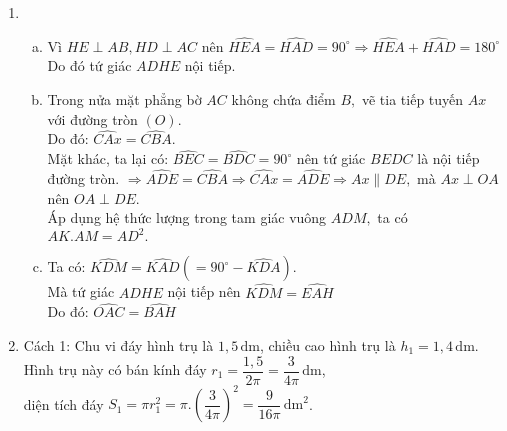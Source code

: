 \begin{ex}
{\begin{center}
	\end{center}
	\begin{enumerate}[1.]
		\item 
			\begin{enumerate}[a)]
				\item Vì $ HE \perp AB , HD \perp AC $ nên $ \widehat{HEA} =\widehat{HAD}=90^{\circ} \Rightarrow \widehat{HEA} +\widehat{HAD}=180^{\circ} $\\
				Do đó tứ giác $ ADHE $ nội tiếp.
				\item Trong nửa mặt phẳng bờ $ AC $ không chứa điểm $ B, $ vẽ tia tiếp tuyến $ Ax $ với đường tròn $ (O). $\\
				Do đó: $ \widehat{CAx}=\widehat{CBA}. $\\
				Mặt khác, ta lại có: $\widehat{BEC}=\widehat{BDC}=90^{\circ}  $ nên tứ giác $ BEDC $ là nội tiếp đường tròn. $ \Rightarrow \widehat{ADE}=\widehat{CBA} \Rightarrow \widehat{CAx}=\widehat{ADE} \Rightarrow Ax \parallel DE, $ mà $ Ax \perp OA $ nên $ OA \perp DE. $ \\
				Áp dụng hệ thức lượng trong tam giác vuông $ ADM, $ ta có $ AK.AM = AD^2. $
				\item Ta có: $ \widehat{KDM}=\widehat{KAD}(=90^{\circ}-\widehat{KDA}). $\\
				Mà tứ giác $ ADHE $ nội tiếp nên $ \widehat{KDM}=\widehat{EAH} $\\
				Do đó: $ \widehat{OAC}=\widehat{BAH} $ 
			\end{enumerate}
		\item Cách 1: Chu vi đáy hình trụ là $1,5\mathrm{\, dm}$, chiều cao hình trụ là $ h_1=1,4\mathrm{\, dm}$.\\
		Hình trụ này có bán kính đáy $ r_1 = \dfrac{1,5}{2\pi}=\dfrac{3}{4\pi}\mathrm{\, dm}$,\\diện tích đáy $ S_1=\pi r_1^2 =\pi . \left(\dfrac{3}{4\pi}\right)^2=\dfrac{9}{16\pi}\mathrm{\, dm}^2$. \\

\end{enumerate}}
\end{ex}
